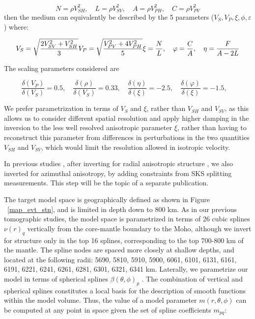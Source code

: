 \documentclass[12pt]{article}
\begin{document}
\begin{equation}
 N = \rho V^{2}_{SH}, \quad L = \rho V^{2}_{SV}, \quad A = \rho V^{2}_{PH} , \quad C = \rho V^{2}_{PV} 
 \end{equation}
then the medium can equivalently be described by the 5 parameters ($V_{S}, V_{P}, \xi, \phi, \varepsilon$) where:

\begin{equation}
V_{S} = \sqrt{\frac{2V^{2}_{SV}+V^{2}_{SH}} {3}} \\
V_{P} = \sqrt{\frac{V^{2}_{PV} + 4V^{2}_{PH}}{5}}
 \xi = \frac{N}{L}, \quad \varphi = \frac{C}{A}, \quad \eta = \frac{F}{A-2L} 
 \end{equation}

 The scaling parameters considered are \citep{montagner1989petrological}

 \begin{equation}
\frac{\delta(V_{P})}{\delta(V_{S})} = 0.5, \quad
\frac{\delta(\rho)}{\delta(V_{S})} = 0.33, \quad
\frac{\delta(\eta)}{\delta(\xi)} = -2.5,   \quad
\frac{\delta(\varphi)}{\delta(\xi)} = -1.5,   \quad
\end{equation}

We prefer parametrization in terms of $V_S$ and $\xi$, rather than $V_{SH}$ and $V_{SV}$, as this allows us to consider different spatial resolution and apply higher damping in the inversion to the less well resolved anisotropic parameter $\xi$, rather than having to reconstruct this parameter from differences in perturbations in the two quantities $V_{SH}$ and $V_{SV}$, which would limit the resolution allowed in isotropic velocity.

In previous studies \citep{marone2007depth,yuan2010lithospheric}, after inverting for radial anisotropic structure \citep{marone2007three,yuan20113}, we also inverted for azimuthal anisotropy, by adding constraints from SKS splitting measurements. This step will be the topic of a separate publication.  

The target model space is geographically defined as shown in Figure ~\ref{map_evt_stn}, and is limited in depth down to 800 km. As in our previous tomographic studies, the model space is parametrized in terms of 26 cubic splines $\nu(r)_{q}$ vertically \citep{megnin2000three} from the core-mantle boundary to the Moho, although we invert for structure only in the top 16 splines, corresponding to the top 700-800 km of the mantle. The spline nodes are spaced more closely at shallow depths, and located at the following radii: 5690, 5810, 5910, 5900, 6061, 6101, 6131, 6161, 6191, 6221, 6241, 6261, 6281, 6301, 6321, 6341 km.  
Laterally, we parametrize our model in terms of spherical splines $\beta(\theta,\phi)_{p}$ \citep{wang1995spherical}. 
The combination of vertical and spherical splines constitutes a local basis for the description of smooth functions within the model volume. 
Thus, the value of a model parameter $m(r,\theta,\phi)$ can be computed at any point in space given the set of spline coefficients $m_{pq}$:
\end{document}
